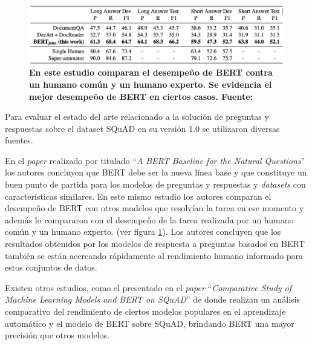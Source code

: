 \begin{figure}[ht!]
    \centering
    \includegraphics[scale=0.69]{figuras/qa-eda-vshuman.png}
    \caption[Preguntas y Respuestas - Comparación rendimiento BERT vs humanos]{\textbf{En este estudio \cite{BERT_baseline_for_NQ_https://doi.org/10.48550/arxiv.1901.08634} comparan el desempeño de BERT contra un humano común y un humano experto. Se evidencia el mejor desempeño de BERT en ciertos casos. Fuente: \cite{BERT_baseline_for_NQ_https://doi.org/10.48550/arxiv.1901.08634}}}
    \label{fig-qa-eda-vshuman}
\end{figure}

Para evaluar el estado del arte relacionado a la solución de preguntas y respuestas sobre el dataset SQuAD en su versión 1.0 se utilizaron diversas fuentes. 

En el \textit{paper} realizado por \citet{BERT_baseline_for_NQ_https://doi.org/10.48550/arxiv.1901.08634} titulado ``\textit{A BERT Baseline for the Natural Questions}'' los autores concluyen que BERT debe ser la nueva línea base y que constituye un buen punto de partida para los modelos de preguntas y respuestas y \textit{datasets} con características similares. En este mismo estudio los autores comparan el desempeño de BERT con otros modelos que resolvían la tarea en ese momento y además lo compararon con el desempeño de la tarea realizada por un humano común y un humano experto. (ver figura \ref{fig-qa-eda-vshuman}). Los autores concluyen que los resultados obtenidos por los modelos de respuesta a preguntas basados en BERT también se están acercando rápidamente al rendimiento humano informado para estos conjuntos de datos.

Existen otros estudios, como el presentado en el \textit{paper} ``\textit{Comparative Study of Machine Learning Models and BERT on SQuAD}'' de \cite{SQuAD_Comparison_https://doi.org/10.48550/arxiv.2005.11313} donde realizan un análisis comparativo del rendimiento de ciertos modelos populares en el aprendizaje automático y el modelo de BERT sobre SQuAD, brindando BERT una mayor precisión que otros modelos.


